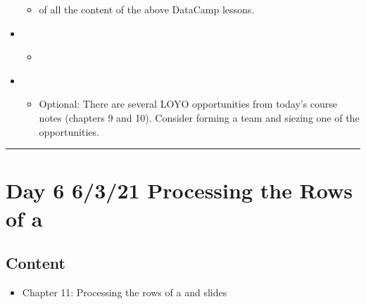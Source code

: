 \documentclass[letterpaper,10pt,english]{jupyterBook}
\begin{document}
\begin{itemize}
\begin{itemize}
\begin{itemize}
\end{itemize}

\item {} 
\sphinxAtStartPar
{} of all the content of the above DataCamp lessons.

\end{itemize}

\item {} 
\sphinxAtStartPar
{}
\begin{itemize}
\item {} 
\sphinxAtStartPar
{\hyperref[\detokenize{chapter-11-processing-rows::doc}]{}}

\end{itemize}

\item {} 
\sphinxAtStartPar
{}
\begin{itemize}
\item {} 
\sphinxAtStartPar
Optional: There are several LOYO opportunities from today’s course notes (chapters 9 and 10).  Consider forming a team and siezing one of the opportunities.

\end{itemize}

\end{itemize}


\bigskip\hrule\bigskip



\section{Day 6 \sphinxhyphen{} 6/3/21 \sphinxhyphen{} Processing the Rows of a }
\label{\detokenize{course-schedule:day-6-6-3-21-processing-the-rows-of-a-dataframe}}

\subsection{Content}
\label{\detokenize{course-schedule:id9}}\begin{itemize}
\item {} 
\sphinxAtStartPar
Chapter 11: Processing the rows of a  \sphinxhyphen{} {\hyperref[\detokenize{chapter-11-processing-rows::doc}]{}} and slides

\end{itemize}
\end{document}
